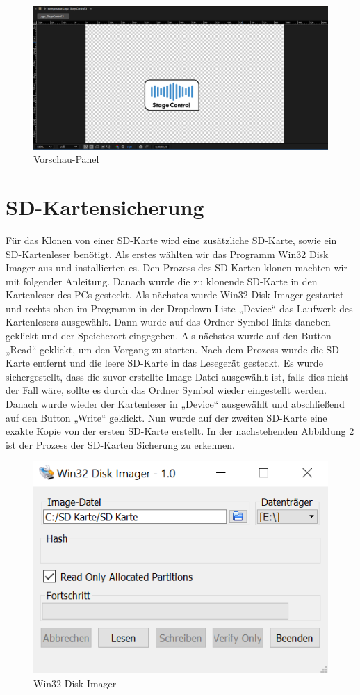 \begin{figure}[H]
	\centering
	\includegraphics[width=0.5\linewidth]{images/Vorschau-Panel.png}
	\caption[Vorschau-Panel]{Vorschau-Panel}
	\label{fig:Vorschau-Panel}
\end{figure} 

\section{SD-Kartensicherung}
Für das Klonen von einer SD-Karte wird eine zusätzliche SD-Karte, sowie ein SD-Kartenleser benötigt. Als erstes wählten wir das Programm Win32 Disk Imager aus und installierten es. Den Prozess des SD-Karten klonen machten wir mit folgender Anleitung. \parencite{SD-Kartenklonen}
Danach wurde die zu klonende SD-Karte in den Kartenleser des PCs gesteckt. Als nächstes wurde Win32 Disk Imager gestartet und rechts oben im Programm in der Dropdown-Liste „Device“ das Laufwerk des Kartenlesers ausgewählt. Dann wurde auf das Ordner Symbol links daneben geklickt und der Speicherort eingegeben. Als nächstes wurde auf den Button „Read“ geklickt, um den Vorgang zu starten. Nach dem Prozess wurde die SD-Karte entfernt und die leere SD-Karte in das Lesegerät gesteckt. Es wurde sichergestellt, dass die zuvor erstellte Image-Datei ausgewählt ist, falls dies nicht der Fall wäre, sollte es durch das Ordner Symbol wieder eingestellt werden. Danach wurde wieder der Kartenleser in „Device“ ausgewählt und abschließend auf den Button „Write“ geklickt. Nun wurde auf der zweiten SD-Karte eine exakte Kopie von der ersten SD-Karte erstellt. In der nachstehenden Abbildung \ref{fig:Win32 Disk Imager} ist der Prozess der SD-Karten Sicherung zu erkennen.

\begin{figure}[H]
	\centering
	\includegraphics[width=0.5\linewidth]{images/Win32 Disk Imager.png}
	\caption[Win32 Disk Imager]{Win32 Disk Imager}
	\label{fig:Win32 Disk Imager}
\end{figure}

